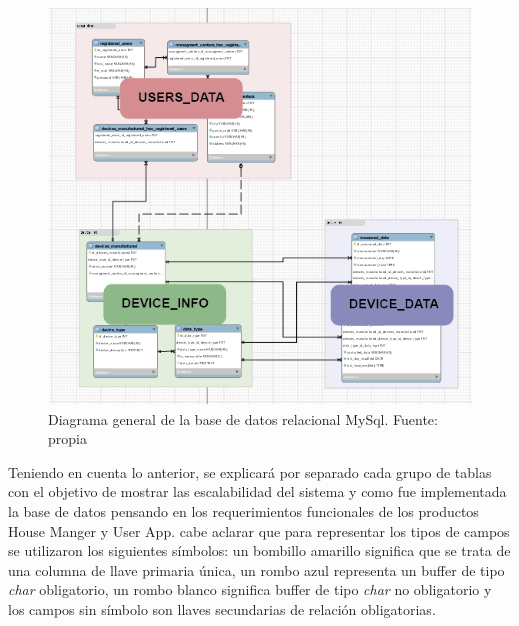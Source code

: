 \begin{figure}[htbp]
	\centerline{\includegraphics[width=15cm]{figuras/UML.png}}
	\caption{Diagrama general de la base de datos relacional MySql. Fuente: propia}
	\label{fig_23}
\end{figure}

Teniendo en cuenta lo anterior, se explicará por separado cada grupo de tablas con el objetivo de mostrar las escalabilidad del sistema y como fue implementada la base de datos pensando en los requerimientos funcionales de los productos House Manger y User App. cabe aclarar que para representar los tipos de campos se utilizaron los siguientes símbolos: un bombillo amarillo significa que se trata de una columna de llave primaria única, un rombo azul representa un buffer de tipo \textit{char} obligatorio, un rombo blanco significa buffer de tipo \textit{char} no obligatorio y los campos sin símbolo son llaves secundarias de relación obligatorias.


